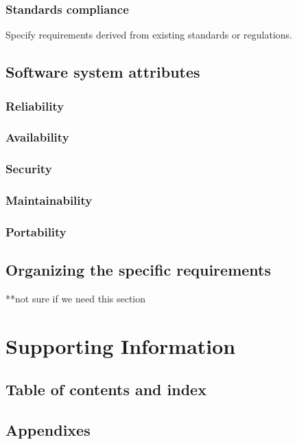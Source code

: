 \documentclass[letterpaper,10pt,draftclsnofoot,onecolumn,titlepage]{IEEEtran}
\begin{document}
	\subsubsection{Standards compliance}
	Specify requirements derived from existing standards or regulations. 
	
	\subsection{Software system attributes}
	\subsubsection{Reliability}
	\subsubsection{Availability}
	\subsubsection{Security}
	\subsubsection{Maintainability}
	\subsubsection{Portability}
	
	\subsection{Organizing the specific requirements}
	**not sure if we need this section
	
	\section{Supporting Information}
	\subsection{Table of contents and index}
	\subsection{Appendixes}
 
\end{document}

